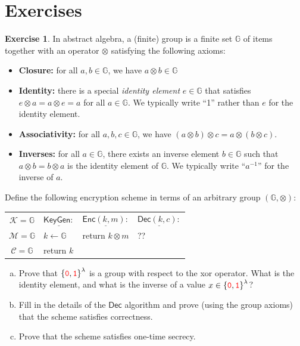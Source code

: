 \documentclass[12pt,openany]{book}
\theoremstyle{definition}
\newtheorem{exercise}{Exercise}[chapter]
\newcommand{\G}{\mathbb{G}}
\newcommand{\KeyGen}{\mathsf{KeyGen}}
\newcommand{\Enc}{\mathsf{Enc}}
\newcommand{\Dec}{\mathsf{Dec}}
\newcommand{\keyspace}{\mathcal{K}}
\newcommand{\messagespace}{\mathcal{M}}
\newcommand{\ciphertextspace}{\mathcal{C}}
\newcommand{\zero}{\textcolor{red}{\texttt{0}}}
\newcommand{\one}{\textcolor{red}{\texttt{1}}}
\newcommand{\tab}{\hspace{12pt}}
\newcommand{\binaryfield}{\set{\zero,\one}}
\begin{document}
	\newpage
	\section*{Exercises}
	\begin{tcolorbox}[colback=white,colframe=execolor,arc=5pt,title={\color{white}\bf }]
		\begin{exercise}
			In abstract algebra, a (finite) group is a finite set $\mathbb{G}$ of items together with an operator $\otimes$ satisfying the following axioms:
			\begin{itemize}
				\item \textbf{Closure:} for all \(a,b\in\mathbb{G}\), we have $a\otimes b\in \mathbb{G}$
				\item \textbf{Identity:} there is a special \textit{identity element} $e\in\G$ that satisfies \(e\otimes a = a\otimes e = a\) for
				all \(a\in\G\). We typically write ``1'' rather than $e$ for the identity element.
				\item \textbf{Associativity:} for all \(a, b, c\in\G\), we have \((a\otimes b)\otimes c = a\otimes (b\otimes c)\).
				\item \textbf{Inverses:} for all \(a\in\G\), there exists an inverse element \(b\in\G\) such that \(a\otimes b = b\otimes a\)
				is the identity element of $\G$. We typically write ``$a^{-1}$'' for the inverse of $a$.
			\end{itemize}
			
			Define the following encryption scheme in terms of an arbitrary group \((\G, \otimes)\):
			\begin{center}
				\begin{tabular}{|clll|}
					\hline
					\(\keyspace=\G\) & \(\underline{\KeyGen:}\) & \(\underline{\Enc(k,m):}\) &\(\underline{\Dec(k,c):}\) \\
					\(\messagespace=\G\) & \tab\(k\gets\G\) & \tab return \(k\otimes m\) & \tab ??\\
					\(\ciphertextspace=\G\) & \tab return \(k\) &&\\
					\hline
				\end{tabular}
			\end{center}
			\begin{enumerate}[(a)]
				\item Prove that \(\binaryfield^\lambda\) is a group with respect to the xor operator. What is the identity
				element, and what is the inverse of a value $x\in\binaryfield^\lambda$?
				\item Fill in the details of the $\Dec$ algorithm and prove (using the group axioms) that the scheme satisfies correctness.
				\item Prove that the scheme satisfies one-time secrecy.
			\end{enumerate}
		\end{exercise}
	\end{tcolorbox}
\end{document}
